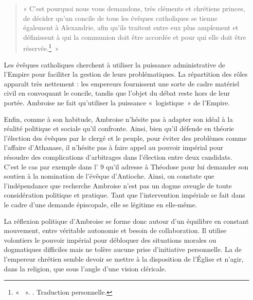 \bigskip

\begin{quote}
    « C'est pourquoi nous vous demandons, très cléments et chrétiens princes, de décider qu'un concile de tous les évêques catholiques se tienne également à Alexandrie, afin qu'ils traitent entre eux plus amplement et définissent à qui la communion doit être accordée et pour qui elle doit être réservée.\footnote{« ~». \cite[\nopp ec. 6, 5]{ambroise_csel_82_3}. Traduction personnelle.}~»
\end{quote}

\bigskip

Les évêques catholiques cherchent à utiliser la puissance administrative de l'Empire pour faciliter la gestion de leurs problématiques. La répartition des rôles apparaît très nettement : les empereurs fournissent une sorte de cadre matériel civil en convoquant le concile, tandis que l'objet du débat reste hors de leur portée. Ambroise ne fait qu'utiliser la puissance «~logistique~» de l'Empire.

\bigskip

Enfin, comme à son habitude, Ambroise n'hésite pas à adapter son idéal à la réalité politique et sociale qu'il confronte. Ainsi, bien qu'il défende en théorie l'élection des évêques par le clergé et le peuple, pour éviter des problèmes comme l'affaire d'Athanase, il n'hésite pas à faire appel au pouvoir impérial pour résoudre des complications d'arbitrages dans l'élection entre deux candidats. C'est le cas par exemple dans l' 9 qu'il adresse à Théodose pour lui demander son soutien à la nomination de l'évêque d'Antioche. Ainsi, on constate que l'indépendance que recherche Ambroise n'est pas un dogme aveugle de toute considération politique et pratique. Tant que l'intervention impériale se fait dans le cadre d'une demande épiscopale, elle se légitime en elle-même.

\bigskip

La réflexion politique d'Ambroise se forme donc autour d'un équilibre en constant mouvement, entre véritable autonomie et besoin de collaboration. Il utilise volontiers le pouvoir impérial pour débloquer des situations morales ou dogmatiques difficiles mais ne tolère aucune prise d'initiative personnelle. La  de l'empereur chrétien semble devoir se mettre à la disposition de l'Église et n'agir, dans la religion, que sous l'angle d'une vision cléricale.


